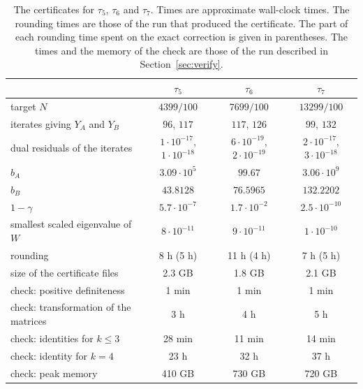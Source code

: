 \documentclass[11pt]{amsart}
\theoremstyle{remark}
\begin{document}
\begin{table}[ht]
\centering
\small
\begin{tabular}{lccc}
\toprule
 & $\tau_5$ & $\tau_6$ & $\tau_7$ \\
\midrule
target $N$ & $4399/100$ & $7699/100$ & $13299/100$ \\
iterates giving $Y_A$ and $Y_B$ & $96$, $117$ & $117$, $126$ & $99$, $132$ \\
dual residuals of the iterates & $1\cdot10^{-17}$, $1\cdot10^{-18}$ & $6\cdot10^{-19}$, $2\cdot10^{-19}$ & $2\cdot10^{-17}$, $3\cdot10^{-18}$ \\
$b_A$ & $3.09\cdot10^{5}$ & $99.67$ & $3.06\cdot10^{9}$ \\
$b_B$ & $43.8128$ & $76.5965$ & $132.2202$ \\
$1-\gamma$ & $5.7\cdot10^{-7}$ & $1.7\cdot10^{-2}$ & $2.5\cdot10^{-10}$ \\
smallest scaled eigenvalue of $W$ & $8\cdot10^{-11}$ & $9\cdot10^{-11}$ & $1\cdot10^{-10}$ \\
rounding & 8 h (5 h) & 11 h (4 h) & 7 h (5 h) \\
size of the certificate files & 2.3 GB & 1.8 GB & 2.1 GB \\
\midrule
check: positive definiteness & 1 min & 1 min & 1 min \\
check: transformation of the matrices & 3 h & 4 h & 5 h \\
check: identities for $k\le3$ & 28 min & 11 min & 14 min \\
check: identity for $k=4$ & 23 h & 32 h & 37 h \\
check: peak memory & 410 GB & 730 GB & 720 GB \\
\bottomrule
\end{tabular}
\medskip
\caption{The certificates for $\tau_5$, $\tau_6$ and $\tau_7$. Times are approximate wall-clock times. The rounding times are those of the run that produced the certificate. The part of each rounding time spent on the exact correction is given in parentheses. The times and the memory of the check are those of the run described in Section~\ref{sec:verify}.}\label{tab:certs}
\end{table}
\end{document}
